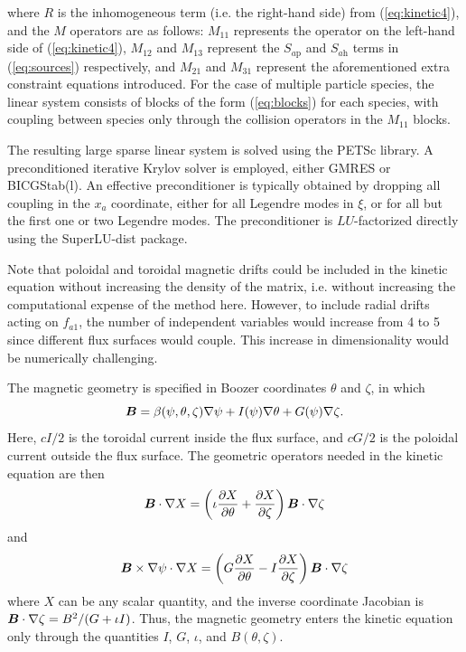 \documentclass[12pt,superscriptaddress]{revtex4}
\newcommand{\vect}[1]{\mbox{\boldmath $#1$}}
\newcommand{\Sap}{S_{a\mathrm{p}}}
\newcommand{\Sah}{S_{a\mathrm{h}}}
\begin{document}
where $R$ is the inhomogeneous term (i.e. the right-hand side) from (\ref{eq:kinetic4}),
and the $M$ operators are as follows: $M_{11}$ represents the operator on the left-hand side of (\ref{eq:kinetic4}),
$M_{12}$ and $M_{13}$ represent the $\Sap$ and $\Sah$ terms
in (\ref{eq:sources}) respectively,
and $M_{21}$ and $M_{31}$ represent the aforementioned extra constraint equations introduced.
For the case of multiple particle species, the linear system consists of blocks of the form (\ref{eq:blocks}) for each
species, with coupling between species only through the collision operators in the $M_{11}$ blocks.

The resulting large sparse linear system is solved using the
PETSc\cite{petsc-web-page, petsc-user-ref} library.
A preconditioned iterative Krylov solver is employed,
either GMRES\cite{GMRES} or BICGStab(l)\cite{BICGstabl}.
An effective preconditioner is typically obtained by dropping all coupling in the $x_a$ coordinate,
either for all Legendre modes in $\xi$, or for all but the first one or two Legendre modes.
The preconditioner is $LU$-factorized directly using the SuperLU-dist\cite{superlu1, superlu2} package.

Note that poloidal and toroidal magnetic drifts could be included in the kinetic equation
without increasing the density of the matrix, i.e. without increasing the computational expense
of the method here.  However, to include radial drifts acting on $f_{a1}$,
the number of independent variables would increase from 4 to 5 since different flux surfaces
would couple. This increase in dimensionality would be numerically challenging.

The magnetic geometry is specified in Boozer coordinates $\theta$ and $\zeta$, in which
\begin{equation}
\vect{B} =  \beta(\psi,\theta,\zeta)\nabla\psi + I(\psi)\nabla\theta + G(\psi) \nabla\zeta.
\end{equation}
Here, 
$cI/2$ is the toroidal current inside the flux surface, and $cG/2$ is the poloidal
current outside the flux surface.
The geometric operators needed in the kinetic equation are then
\begin{equation}
\vect{B}\cdot\nabla X = \left( \iota \frac{\partial X}{\partial\theta} + \frac{\partial X}{\partial\zeta}\right)\vect{B}\cdot\nabla\zeta
\end{equation}
and
\begin{equation}
\vect{B}\times\nabla\psi\cdot\nabla X = \left( G \frac{\partial X}{\partial\theta} -I \frac{\partial X}{\partial\zeta}\right)\vect{B}\cdot\nabla\zeta
\end{equation}
where $X$ can be any scalar quantity,
and the inverse coordinate Jacobian is
$\vect{B}\cdot\nabla\zeta = B^2/(G+\iota I)$. Thus, the magnetic geometry
enters the kinetic equation only through the quantities $I$, $G$, $\iota$,
and $B(\theta,\zeta)$.
\end{document}
